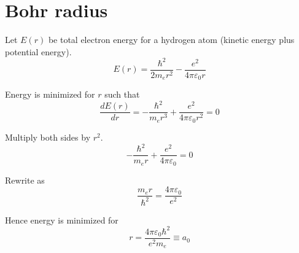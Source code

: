 

\section*{Bohr radius}

Let $E(r)$ be total electron energy for a hydrogen atom (kinetic energy plus potential energy).
\begin{equation*}
E(r)=\frac{\hbar^2}{2m_er^2}-\frac{e^2}{4\pi\varepsilon_0r}
\end{equation*}

Energy is minimized for $r$ such that
\begin{equation*}
\frac{dE(r)}{dr}=-\frac{\hbar^2}{m_er^3}+\frac{e^2}{4\pi\varepsilon_0r^2}=0
\end{equation*}

Multiply both sides by $r^2$.
\begin{equation*}
-\frac{\hbar^2}{m_er}+\frac{e^2}{4\pi\varepsilon_0}=0
\end{equation*}

Rewrite as
\begin{equation*}
\frac{m_er}{\hbar^2}=\frac{4\pi\varepsilon_0}{e^2}
\end{equation*}

Hence energy is minimized for
\begin{equation*}
r=\frac{4\pi\varepsilon_0\hbar^2}{e^2m_e}\equiv a_0
\end{equation*}


